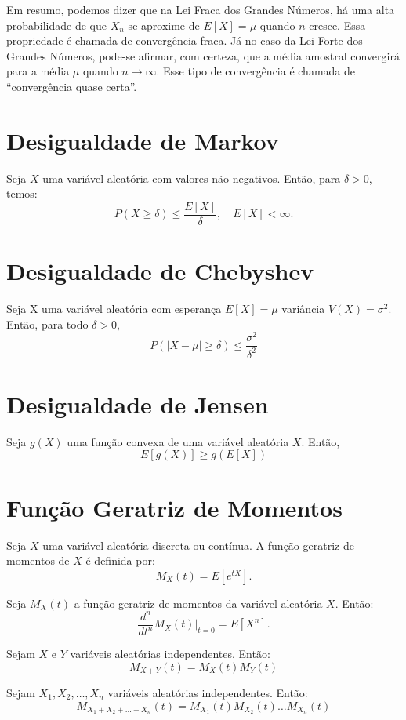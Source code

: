 \documentclass{article}
\begin{document}
Em resumo, podemos dizer que na Lei Fraca dos Grandes Números, há uma alta probabilidade de que $\bar{X}_n$ se aproxime de $E[X] = \mu$ quando $n$ cresce. Essa propriedade é chamada de convergência fraca. Já no caso da Lei Forte dos Grandes Números, pode-se afirmar, com certeza, que a média amostral convergirá para a média $\mu$ quando $n \to \infty$. Esse tipo de convergência é chamada de “convergência quase certa”.

\section{Desigualdade de Markov}
Seja $X$ uma variável aleatória com valores não-negativos. Então, para $\delta > 0$, temos:
    $$
    P(X \geq \delta) \leq \frac{E[X]}{\delta}, \quad E[X] < \infty.
    $$

\section{Desigualdade de Chebyshev}
Seja X uma variável aleatória com esperança $E[X] = \mu$ variância $V(X) = \sigma^2$.
Então, para todo $\delta > 0$,
    $$
    P(|X - \mu| \geq \delta) \leq \frac{\sigma^2}{\delta^2}
    $$

\section{Desigualdade de Jensen}
Seja $g(X)$ uma função convexa de uma variável aleatória $X$. Então,
    $$
    E[g(X)] \geq g(E[X])
    $$

\section{Função Geratriz de Momentos}
Seja $X$ uma variável aleatória discreta ou contínua. A função geratriz de momentos de $X$ é definida por:
    $$
    M_X(t) = E[e^{tX}].
    $$

Seja $M_X(t)$ a função geratriz de momentos da variável aleatória $X$. Então:
    $$
    \frac{d^n}{dt^n} M_X(t) \bigg|_{t=0} = E[X^n].
    $$

Sejam $X$ e $Y$ variáveis aleatórias independentes. Então:
    $$
    M_{X+Y}(t) = M_X(t) M_Y(t)
    $$

Sejam $X_1, X_2, \ldots, X_n$ variáveis aleatórias independentes. Então:
    $$
    M_{X_1+X_2+\ldots+X_n}(t) = M_{X_1}(t) M_{X_2}(t) \ldots M_{X_n}(t)
    $$
\end{document}
